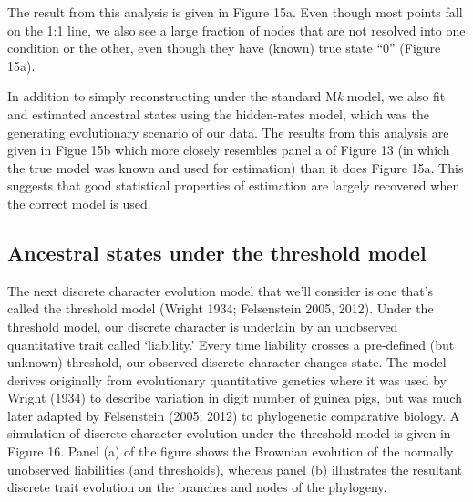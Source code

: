 \documentclass{article}
\begin{document}
The result from this analysis is given in Figure 15a. Even though most points fall on the 1:1 line, we also see a large fraction of nodes that are not resolved into one condition or the other, even though they have (known) true state ``0'' (Figure 15a).

In addition to simply reconstructing under the standard M\emph{k} model, we also fit and estimated ancestral states using the hidden-rates model, which was the generating evolutionary scenario of our data. The results from this analysis are given in Figue 15b which more closely resembles panel a of Figure 13 (in which the true model was known and used for estimation) than it does Figure 15a. This suggests that good statistical properties of estimation are largely recovered when the correct model is used.

\subsection{Ancestral states under the threshold model}\label{ancestral-states-under-the-threshold-model}

The next discrete character evolution model that we'll consider is one that's called the threshold model (Wright 1934; Felsenstein 2005, 2012). Under the threshold model, our discrete character is underlain by an unobserved quantitative trait called `liability.' Every time liability crosses a pre-defined (but unknown) threshold, our observed discrete character changes state. The model derives originally from evolutionary quantitative genetics where it was used by Wright (1934) to describe variation in digit number of guinea pigs, but was much later adapted by Felsenstein (2005; 2012) to phylogenetic comparative biology. A simulation of discrete character evolution under the threshold model is given in Figure 16. Panel (a) of the figure shows the Brownian evolution of the normally unobserved liabilities (and thresholds), whereas panel (b) illustrates the resultant discrete trait evolution on the branches and nodes of the phylogeny.
\end{document}
